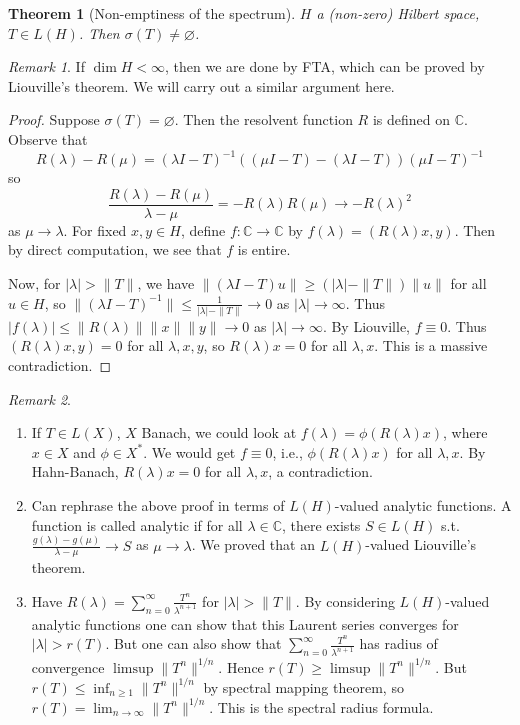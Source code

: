 \documentclass{article}
\theoremstyle{definition}
\theoremstyle{remark}
\newtheorem{rem}{Remark}
\theoremstyle{plain}
\newtheorem{thm}[defn]{Theorem}
\newcommand{\CC}{\mathbb{C}}
\begin{document}
\begin{thm}[Non-emptiness of the spectrum]
    $H$ a (non-zero) Hilbert space, $T\in L(H)$. Then $\sigma(T)\neq\varnothing$.
\end{thm}
\begin{rem}
    If $\dim H<\infty$, then we are done by FTA, which can be proved by Liouville's theorem. We will carry out a similar argument here.
\end{rem}
\begin{proof}
    Suppose $\sigma(T)=\varnothing$. Then the resolvent function $R$ is defined on $\CC$. Observe that
    \[R(\lambda)-R(\mu)=(\lambda I-T)^{-1}((\mu I-T)-(\lambda I-T))(\mu I-T)^{-1}\]
    so 
    \[\dfrac{R(\lambda)-R(\mu)}{\lambda-\mu}=-R(\lambda)R(\mu)\to -R(\lambda)^2\]
     as $\mu\to \lambda$.
     For fixed $x,y\in H$, define $f:\CC\to \CC$ by $f(\lambda)=(R(\lambda)x,y)$. Then by direct computation, we see that $f$ is entire.

    Now, for $|\lambda|>\|T\|$, we have $\|(\lambda I-T)u\|\ge (|\lambda|-\|T\|)\|u\|$ for all $u\in H$, so $\|(\lambda I-T)^{-1}\|\le \frac{1}{|\lambda|-\|T\|}\to 0$ as $|\lambda|\to\infty$. Thus $|f(\lambda)|\le \|R(\lambda)\|\|x\|\|y\|\to 0$ as $|\lambda|\to\infty$. By Liouville, $f\equiv 0$. Thus $(R(\lambda)x,y)=0$ for all $\lambda,x,y$, so $R(\lambda)x=0$ for all $\lambda,x$. This is a massive contradiction.
\end{proof}
\begin{rem}
    \begin{enumerate}[1)]
        \item If $T\in L(X)$, $X$ Banach, we could look at $f(\lambda)=\phi(R(\lambda)x)$, where $x\in X$ and $\phi\in X^\ast$. We would get $f\equiv 0$, i.e., $\phi(R(\lambda)x)$ for all $\lambda, x$. By Hahn-Banach, $R(\lambda)x=0$ for all $\lambda, x$, a contradiction.
        \item Can rephrase the above proof in terms of $L(H)$-valued analytic functions. A function is called analytic  if for all $\lambda\in\CC$, there exists $S\in L(H)$ s.t. $\frac{g(\lambda)-g(\mu)}{\lambda-\mu}\to S$ as $\mu\to\lambda$. We proved that an $L(H)$-valued Liouville's theorem.
        \item Have $R(\lambda)=\sum_{n=0}^\infty\frac{T^n}{\lambda^{n+1}}$ for $|\lambda|>\|T\|$.  By considering $L(H)$-valued analytic functions one can show that this Laurent series converges for $|\lambda|>r(T)$. But one can also show that $\sum_{n=0}^\infty\frac{T^n}{\lambda^{n+1}}$ has radius of convergence $\limsup\|T^n\|^{1/n}$. Hence $r(T)\ge \limsup\|T^n\|^{1/n}$. But $r(T)\le \inf_{n\ge 1}\|T^n\|^{1/n}$ by spectral mapping theorem, so $r(T)=\lim_{n\to\infty} \|T^n\|^{1/n}$. This is the spectral radius formula.
    \end{enumerate}
\end{rem}
\end{document}

